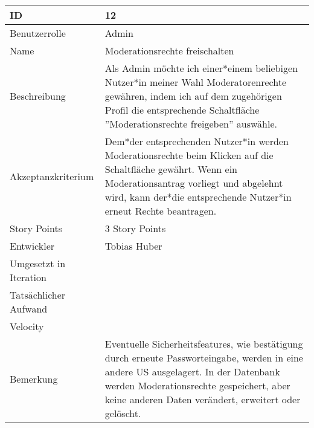 \begin{tabularx}{\textwidth}{|p{}|X|}
	\hline
	ID & 12\\
	\hline
	Benutzerrolle & Admin\\
	\hline
	Name & Moderationsrechte freischalten\\
	\hline
	Beschreibung & Als Admin möchte ich einer*einem beliebigen Nutzer*in meiner Wahl Moderatorenrechte gewähren, indem ich auf dem zugehörigen Profil die entsprechende Schaltfläche ''Moderationsrechte freigeben'' auswähle.\\
	\hline
	Akzeptanzkriterium & Dem*der entsprechenden Nutzer*in werden Moderationsrechte beim Klicken auf die Schaltfläche gewährt. Wenn ein Moderationsantrag vorliegt und abgelehnt wird, kann der*die entsprechende Nutzer*in erneut Rechte beantragen.\\
	\hline
	Story Points & 3 Story Points\\
	\hline
	Entwickler & Tobias Huber\\
	\hline
	Umgesetzt in Iteration & \\
	\hline
	Tatsächlicher Aufwand & \\
	\hline
	Velocity & \\
	\hline
	Bemerkung & Eventuelle Sicherheitsfeatures, wie bestätigung durch erneute Passworteingabe, werden in eine andere US ausgelagert. In der Datenbank werden Moderationsrechte gespeichert, aber keine anderen Daten verändert, erweitert oder gelöscht.\\
	\hline
\end{tabularx}
\vspace{20pt}
